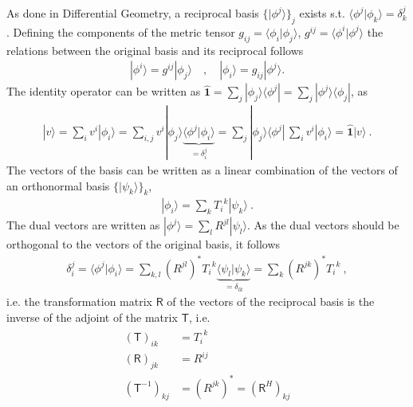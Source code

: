 \documentclass[letterpaper,10pt,english]{jupyterBook}
\begin{document}
\sphinxAtStartPar
As done in Differential Geometry, a reciprocal basis \(\{ | \phi^j \rangle \}_j\) exists s.t. \(\langle \phi^j | \phi_k \rangle = \delta^j_k\). Defining the components of the metric tensor \(g_{ij} = \langle \phi_i | \phi_j \rangle\), \(g^{ij} = \langle \phi^i | \phi^j \rangle\) the relations between the original basis and its reciprocal follows
\begin{equation*}
\begin{split}| \phi^i \rangle = g^{ij} | \phi_j \rangle \quad , \quad | \phi_i \rangle = g_{ij} | \phi^j \rangle .\end{split}
\end{equation*}
\sphinxAtStartPar
The identity operator can be written as \(\hat{\mathbf{1}} = \sum_j | \phi_j \rangle \langle \phi^j | =  \sum_j | \phi^j \rangle \langle \phi_j |\), as
\begin{equation*}
\begin{split}| v \rangle = \sum_i v^i | \phi_i \rangle = \sum_{i,j} v^i | \phi_j \rangle \underbrace{\langle \phi^j | \phi_i \rangle}_{=\delta^j_i} = \sum_{j} | \phi_j\rangle \langle \phi^j | \, \sum_i v^i | \phi_i \rangle = \hat{\mathbf{1}} | v \rangle \ . \end{split}
\end{equation*}
\sphinxAtStartPar
The vectors of the basis can be written as a linear combination of the vectors of an orthonormal basis \(\{ | \psi_k \rangle \}_k\),
\begin{equation*}
\begin{split}| \phi_i \rangle = \sum_{k} T_{i}^{\ \ k} | \psi_k \rangle \ .\end{split}
\end{equation*}
\sphinxAtStartPar
The dual vectors are written as \(| \phi^j \rangle = \sum_l R^{jl} | \psi_l \rangle\). As the dual vectors should be orthogonal to the vectors of the original basis, it follows
\begin{equation*}
\begin{split}\delta^{j}_{i} = \langle \phi^j | \phi_i \rangle = \sum_{k,l} \left( R^{jl} \right)^* T_{i}^{\ \ k} \underbrace{\langle \psi_l | \psi_k \rangle}_{= \delta_{lk}} = \sum_{k} \left( R^{jk} \right)^* T_{i}^{\ \ k} \ ,\end{split}
\end{equation*}
\sphinxAtStartPar
i.e. the transformation matrix \(\mathsf{R}\) of the vectors of the reciprocal basis is the inverse of the adjoint of the matrix \(\mathsf{T}\), i.e.
\begin{equation*}
\begin{split}\begin{aligned}
  \left( \mathsf{T} \right)_{ik} & = T_i^{\ \ k} \\
  \left( \mathsf{R} \right)_{jk} & = R^{ij} \\
  \left( \mathsf{T}^{-1} \right)_{kj} & = \left( R^{jk} \right)^* = \left( \mathsf{R}^H \right)_{kj} \\
\end{aligned}\end{split}
\end{equation*}
\end{document}
